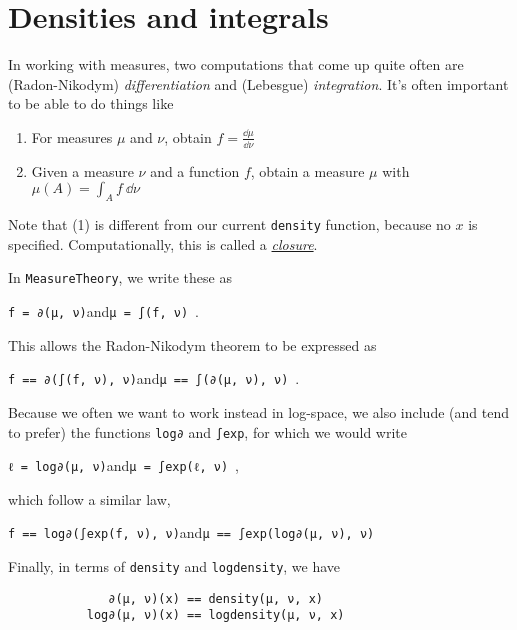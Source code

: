 \documentclass{juliacon}
\begin{document}
\section{Densities and integrals}

In working with measures, two computations that come up quite often are (Radon-Nikodym) \emph{differentiation} and (Lebesgue) \emph{integration}. It's often important to be able to do things like
\begin{enumerate}
    \item For measures $\mu$ and $\nu$, obtain $f=\frac{\dd\mu}{\dd\nu}$
    \item Given a measure $\nu$ and a function $f$, obtain a measure $\mu$ with $\mu(A)=\int_A f\ \dd\nu$
\end{enumerate}

Note that (1) is different from our current \verb|density| function, because no $x$ is specified. Computationally, this is called a \href{https://en.wikipedia.org/wiki/Closure_(computer_programming)}{\emph{closure}}.

In \verb|MeasureTheory|, we write these as 

\begin{center}
    \verb|f = ∂(μ, ν)|\quad and\quad \verb|μ = ∫(f, ν)|\ .
\end{center}

This allows the Radon-Nikodym theorem to be expressed as
\begin{center}
    \verb|f == ∂(∫(f, ν), ν)|\quad and\quad \verb|μ == ∫(∂(μ, ν), ν)|\ .
\end{center}

Because we often we want to work instead in log-space, we also include (and tend to prefer) the functions \verb|log∂| and \verb|∫exp|, for which we would write
\begin{center}
    \verb|ℓ = log∂(μ, ν)|\quad and\quad \verb|μ = ∫exp(ℓ, ν)|\ ,
\end{center}
which follow a similar law,
\begin{center}
\verb|f == log∂(∫exp(f, ν), ν)|\quad and\quad \verb|μ == ∫exp(log∂(μ, ν), ν)|
\end{center}

Finally, in terms of \verb|density| and \verb|logdensity|, we have
\begin{verbatim}
              ∂(μ, ν)(x) == density(μ, ν, x)
           log∂(μ, ν)(x) == logdensity(μ, ν, x)
\end{verbatim}
\end{document}
